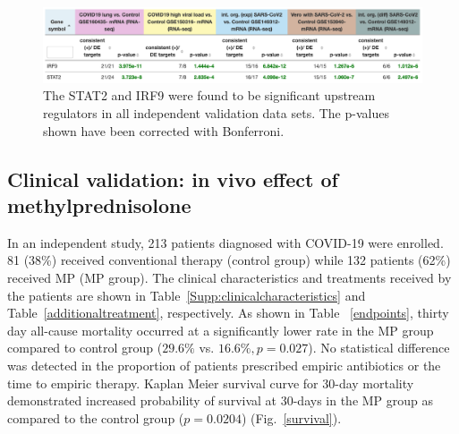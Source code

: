 \documentclass[Minh_PhD_thesis.tex]{subfiles}
\begin{document}
\begin{figure}
\centering
	\includegraphics[width=1\linewidth]{../Figures/STAT2-IRF9validation.png}
    \caption{The STAT2 and IRF9 were found to be significant upstream regulators in all independent validation data sets. The p-values shown have been corrected with Bonferroni.}
        \label{Supp:STAT2-IRF9validation}
\end{figure}

\subsection{Clinical validation: in vivo effect of methylprednisolone}

In an independent study, 213 patients diagnosed with COVID-19 were enrolled. 81 (38\%) received conventional therapy (control group) while 132 patients (62\%) received MP (MP group). The clinical characteristics and treatments received by the patients are shown in Table~\ref{Supp:clinicalcharacteristics} and Table~\ref{additionaltreatment}, respectively. As shown in Table ~\ref{endpoints}, thirty day all-cause mortality occurred at a significantly lower rate in the MP group compared to control group ($29.6\%$ vs. $16.6\%, p=0.027$). No statistical difference was detected in the proportion of patients prescribed empiric antibiotics or the time to empiric therapy. Kaplan Meier survival curve for 30-day mortality demonstrated increased probability of survival at 30-days in the MP group as compared to the control group ($p= 0.0204$) (Fig.~\ref{survival}).
\end{document}
